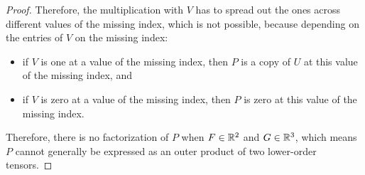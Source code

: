 \begin{proof}
    Therefore, the multiplication with $V$ has to spread out the ones across different values of the missing index,
    which is not possible, because depending on the entries of $V$ on the missing index:
    \begin{itemize}
        \item if $V$ is one at a value of the missing index, then $P$ is a copy of $U$ at this value of the missing index, and
        \item if $V$ is zero at a value of the missing index, then $P$ is zero at this value of the missing index.
    \end{itemize}

    Therefore, there is no factorization of $P$ when $F \in \mathbb{R}^2$ and $G \in \mathbb{R}^3$,
    which means $P$ cannot generally be expressed as an outer product of two lower-order tensors.
\end{proof}